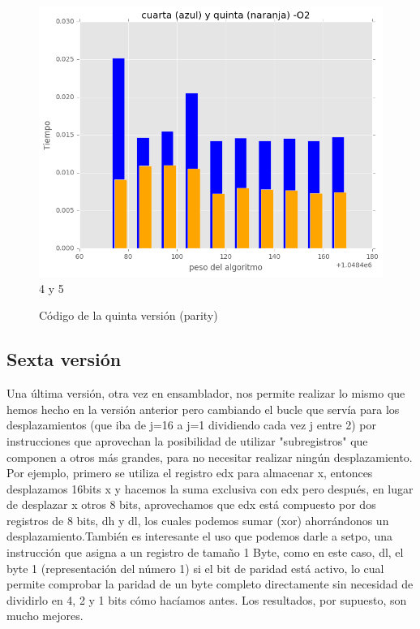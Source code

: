 \documentclass[a4paper, 11pt]{article}
\begin{document}
\begin{figure}[!hbp]
	\includegraphics[scale=0.6]{4y5p_2.png}
	\caption{4 y 5	\label{4y5_2}}
\end{figure}
\begin{figure}[!hbp]
	
	\caption{Código de la quinta versión (parity)	\label{parity cuarta versión}}
\end{figure}

\subsection{Sexta versión}
Una última versión, otra vez en ensamblador, nos permite realizar lo mismo que hemos hecho en la versión anterior pero cambiando el bucle que servía para los desplazamientos (que iba de j=16 a j=1 dividiendo cada vez j entre 2) por instrucciones que aprovechan la posibilidad de utilizar "subregistros" que componen a otros más grandes, para no necesitar realizar ningún desplazamiento. Por ejemplo, primero se utiliza el registro edx para almacenar x, entonces desplazamos 16bits x y hacemos la suma exclusiva con edx pero después, en lugar de desplazar x otros 8 bits, aprovechamos que edx está compuesto por dos registros de 8 bits, dh y dl, los cuales podemos sumar (xor) ahorrándonos un desplazamiento.También es interesante el uso que podemos darle a setpo, una instrucción que asigna a un registro de tamaño 1 Byte, como en este caso, dl, el byte 1 (representación del número 1) si el bit de paridad está activo, lo cual permite comprobar la paridad de un byte completo directamente sin necesidad de dividirlo en 4, 2 y 1 bits cómo hacíamos antes. Los resultados, por supuesto, son mucho mejores. 
\end{document}
